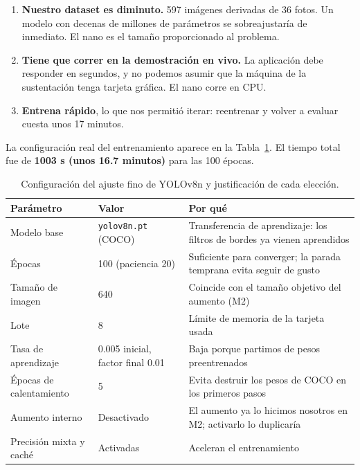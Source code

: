\documentclass[11pt,a4paper]{article}
\begin{document}
\begin{enumerate}
  \item \textbf{Nuestro dataset es diminuto.} 597 imágenes derivadas de 36 fotos. Un modelo con
        decenas de millones de parámetros se sobreajustaría de inmediato. El nano es el tamaño
        proporcionado al problema.
  \item \textbf{Tiene que correr en la demostración en vivo.} La aplicación debe responder en
        segundos, y no podemos asumir que la máquina de la sustentación tenga tarjeta gráfica. El
        nano corre en CPU.
  \item \textbf{Entrena rápido}, lo que nos permitió iterar: reentrenar y volver a evaluar cuesta
        unos 17 minutos.
\end{enumerate}

La configuración real del entrenamiento aparece en la Tabla~\ref{tab:yoloconfig}. El tiempo total
fue de \textbf{1003 s (unos 16.7 minutos)} para las 100 épocas.

\begin{table}[htbp]
\centering
\caption{Configuración del ajuste fino de YOLOv8n y justificación de cada elección.}
\label{tab:yoloconfig}
\small
\begin{tabularx}{\textwidth}{@{}l l X@{}}
\toprule
\textbf{Parámetro} & \textbf{Valor} & \textbf{Por qué} \\
\midrule
Modelo base & \texttt{yolov8n.pt} (COCO) & Transferencia de aprendizaje: los filtros de bordes ya vienen aprendidos \\
Épocas & 100 (paciencia 20) & Suficiente para converger; la parada temprana evita seguir de gusto \\
Tamaño de imagen & 640 & Coincide con el tamaño objetivo del aumento (M2) \\
Lote & 8 & Límite de memoria de la tarjeta usada \\
Tasa de aprendizaje & 0.005 inicial, factor final 0.01 & Baja porque partimos de pesos preentrenados \\
Épocas de calentamiento & 5 & Evita destruir los pesos de COCO en los primeros pasos \\
Aumento interno & Desactivado & El aumento ya lo hicimos nosotros en M2; activarlo lo duplicaría \\
Precisión mixta y caché & Activadas & Aceleran el entrenamiento \\
\bottomrule
\end{tabularx}
\end{table}
\end{document}
